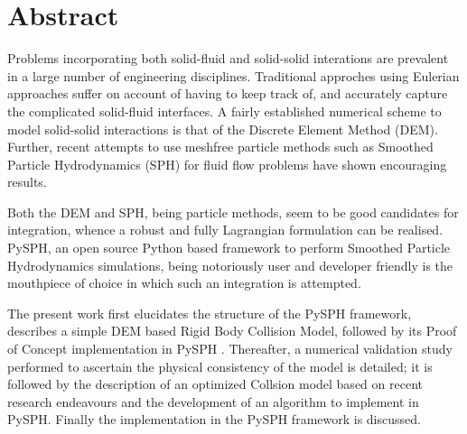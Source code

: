 \chapter*{Abstract}

Problems incorporating both solid-fluid and solid-solid interations are prevalent in a large number of engineering disciplines. Traditional approches using Eulerian approaches suffer on account of having to keep track of, and accurately capture the complicated solid-fluid interfaces. A fairly established numerical scheme to model solid-solid interactions is that of the Discrete Element Method (DEM). Further, recent attempts to use meshfree particle methods such as Smoothed Particle Hydrodynamics (SPH) for fluid flow problems have shown encouraging results.

Both the DEM and SPH, being particle methods, seem to be good candidates for integration, whence a robust and fully Lagrangian formulation can be realised. PySPH, an open source Python based framework to perform Smoothed Particle Hydrodynamics simulations, being notoriously user and developer friendly is the mouthpiece of choice in which such an integration is attempted.

The present work first elucidates the structure of the PySPH framework, describes a simple DEM based Rigid Body Collision Model, followed by its Proof of Concept implementation in PySPH . Thereafter, a numerical validation study performed to ascertain the physical consistency of the model is detailed; it is followed by the description of an optimized Collsion model based on recent research endeavours and the development of an algorithm to implement in PySPH. Finally the implementation in the PySPH framework is discussed.

